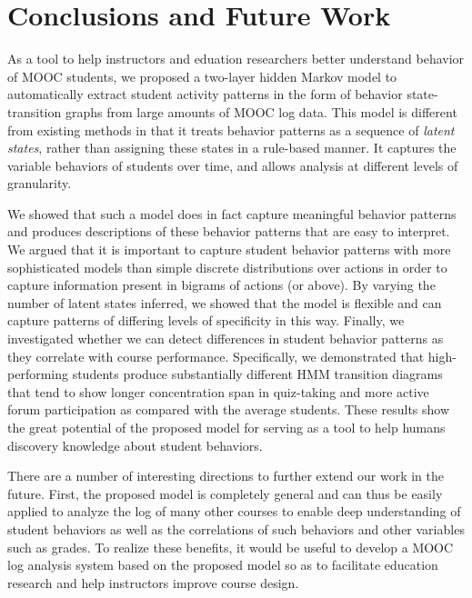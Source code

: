 \section{Conclusions and Future Work}
As a tool to help instructors and eduation researchers better understand behavior of MOOC students, 
 we proposed a two-layer hidden Markov model to automatically extract 
student activity patterns in the form of behavior state-transition graphs from large amounts of 
MOOC log data. This model is different from existing
methods in that it treats behavior patterns as a sequence of \emph{latent
states}, rather than assigning these states in a rule-based manner. It
captures the variable behaviors of students over time, and allows
analysis at different levels of granularity.

We showed that such a model does in fact capture meaningful behavior
patterns and produces descriptions of these behavior patterns that are easy
to interpret. We argued that it is important to capture student behavior
patterns with more sophisticated models than simple discrete distributions
over actions in order to capture information present in bigrams of actions
(or above). By varying the number of latent
states inferred, we showed that the model is flexible and can capture
patterns of differing levels of specificity in this way.  Finally, we
investigated whether we can detect differences in student behavior patterns
as they correlate with course performance. Specifically, we demonstrated
that high-performing students produce substantially different HMM
transition diagrams that tend to show longer concentration span in quiz-taking
and more active  forum participation as compared with the average students.
These results show the great potential of the proposed model for serving as a tool
to help humans discovery knowledge about student behaviors.  


There are a number of interesting directions to further extend our work in the future. 
First, the proposed model is 
completely general and can thus be easily applied to analyze the log of many
other courses to enable deep understanding of student behaviors as well as
the correlations of such behaviors and other variables such as grades. To realize these benefits, 
it would be useful 
to develop a MOOC log analysis system based on the proposed model so as to facilitate education research and help instructors improve course
design.

